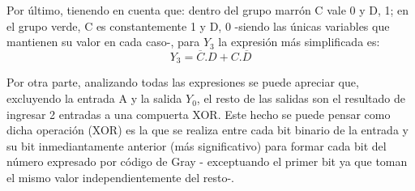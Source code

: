 \noindent
Por \'ultimo, tienendo en cuenta que: dentro del grupo marr\'on C vale 0 y D, 1; en el grupo verde, C es constantemente 1 y D, 0 -siendo las \'unicas variables que mantienen su valor en cada caso-, para $Y_3$ la expresi\'on m\'as simplificada es: 
 \begin{equation}
 Y_3 = \overline{C}.D
 + C.\overline{D}
     \label{ecy3}
 \end{equation}

\noindent
Por otra parte, analizando todas las expresiones se puede apreciar que, excluyendo la entrada A y la salida $Y_0$, el resto de las salidas son el resultado de ingresar 2 entradas a una compuerta XOR. Este hecho se puede pensar como dicha operaci\'on (XOR) es la que se realiza entre cada bit binario de la entrada y su bit inmediantamente anterior (m\'as significativo) para formar cada bit del n\'umero expresado por c\'odigo de Gray - exceptuando el primer bit ya que toman el mismo valor independientemente del resto-.
